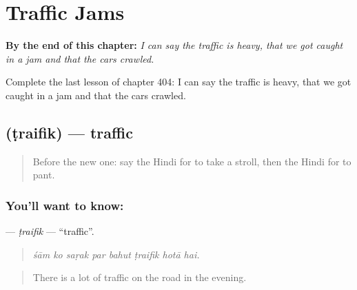 
\chapter{Traffic Jams}
\label{ch:hi-traffic-jams}

\begin{chapteropening}
\textbf{By the end of this chapter:} \emph{I can say the traffic is heavy, that we got caught in a jam and that the cars crawled.}

Complete the last lesson of chapter 404: I can say the traffic is heavy, that we got caught in a jam and that the cars crawled.
\end{chapteropening}

\section[\texorpdfstring{\hi{ट्रैफ़िक} (ṭraifik)}{ट्रैफ़िक (ṭraifik)}]{ (ṭraifik) — traffic}

\label{lesson:HI-C404-traifik}



\begin{quote}
Before the new one: say the Hindi for to take a stroll, then the Hindi for to pant.
\end{quote}

\subsection*{You'll want to know: }
\textbf{} — \emph{ṭraifik} — \textquotedblleft{}traffic\textquotedblright{}.

\begin{quote}
       
\end{quote}

\begin{quote}
\emph{śām ko saṛak par bahut ṭraifik hotā hai.}
\end{quote}

\begin{quote}
There is a lot of traffic on the road in the evening.
\end{quote}

